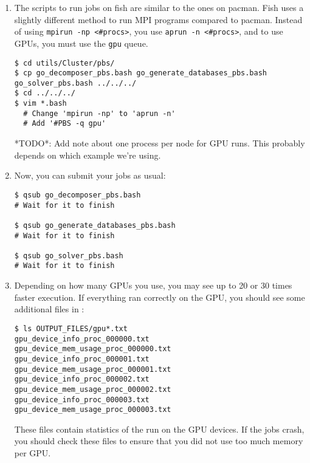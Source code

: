 \documentclass[10pt,fleqn,letterpaper]{article}
\begin{document}
\begin{enumerate}
\item The scripts to run jobs on fish are similar to the ones on pacman. Fish
      uses a slightly different method to run MPI programs compared to pacman.
      Instead of using \texttt{mpirun -np <\#procs>}, you use
      \texttt{aprun -n <\#procs>}, and to use GPUs, you must use the \texttt{gpu}
      queue.
\begin{lstlisting}
$ cd utils/Cluster/pbs/
$ cp go_decomposer_pbs.bash go_generate_databases_pbs.bash go_solver_pbs.bash ../../../
$ cd ../../../
$ vim *.bash
  # Change 'mpirun -np' to 'aprun -n'
  # Add '#PBS -q gpu'
\end{lstlisting}
*TODO*: Add note about one process per node for GPU runs. This probably depends
on which example we're using.

\item Now, you can submit your jobs as usual:
\begin{lstlisting}
$ qsub go_decomposer_pbs.bash
# Wait for it to finish

$ qsub go_generate_databases_pbs.bash
# Wait for it to finish

$ qsub go_solver_pbs.bash
# Wait for it to finish
\end{lstlisting}

\item Depending on how many GPUs you use, you may see up to 20 or 30 times
      faster execution. If everything ran correctly on the GPU, you should see
      some additional files in :
\begin{lstlisting}
$ ls OUTPUT_FILES/gpu*.txt
gpu_device_info_proc_000000.txt
gpu_device_mem_usage_proc_000000.txt
gpu_device_info_proc_000001.txt
gpu_device_mem_usage_proc_000001.txt
gpu_device_info_proc_000002.txt
gpu_device_mem_usage_proc_000002.txt
gpu_device_info_proc_000003.txt
gpu_device_mem_usage_proc_000003.txt
\end{lstlisting}

      These files contain statistics of the run on the GPU devices. If the jobs
      crash, you should check these files to ensure that you did not use too
      much memory per GPU.
\end{enumerate}


%
%

\end{document}
